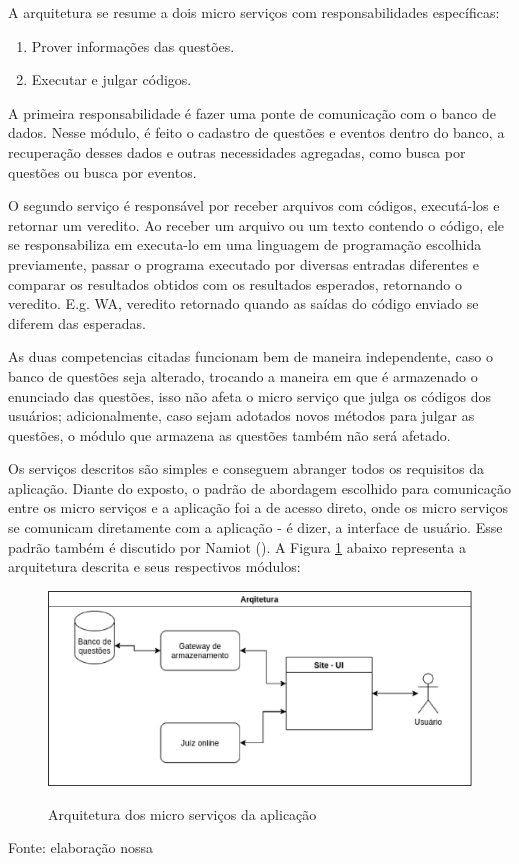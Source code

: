 A arquitetura se resume a dois micro serviços com responsabilidades específicas:
\begin{enumerate}
    \item Prover informações das questões.
    \item Executar e julgar códigos.
\end{enumerate}

A primeira responsabilidade é fazer uma ponte de comunicação com o banco de dados. Nesse módulo, é feito o cadastro de questões e eventos dentro do banco, a recuperação desses dados e outras necessidades agregadas, como busca por questões ou busca por eventos.

O segundo serviço é responsável por receber arquivos com códigos, executá-los e retornar um veredito. Ao receber um arquivo ou um texto contendo o código, ele se responsabiliza em executa-lo em uma linguagem de programação escolhida previamente, passar o programa executado por diversas entradas diferentes e comparar os resultados obtidos com os resultados esperados, retornando o veredito. E.g. WA, veredito retornado quando as saídas do código enviado se diferem das esperadas.

As duas competencias citadas funcionam bem de maneira independente, caso o banco de questões seja alterado, trocando a maneira em que é armazenado o enunciado das questões, isso não afeta o micro serviço que julga os códigos dos usuários; adicionalmente, caso sejam adotados novos métodos para julgar as questões, o módulo que armazena as questões também não será afetado.

Os serviços descritos são simples e conseguem abranger todos os requisitos da aplicação. Diante do exposto, o padrão de abordagem escolhido para comunicação entre os micro serviços e a aplicação foi a de acesso direto, onde os micro serviços se comunicam diretamente com a aplicação - é dizer, a interface de usuário. Esse padrão também é discutido por Namiot (\citeyear{namiot_d:OMSA}). A Figura \ref{fig:architecture} abaixo representa a arquitetura descrita e seus respectivos módulos:

\begin{figure}[h]
    \centering
    \caption{Arquitetura dos micro serviços da aplicação}
    \includegraphics[keepaspectratio=true,scale=0.6]{figuras/arquiteture.eps}
    \label{fig:architecture}
\end{figure}
\begin{center}
    Fonte: elaboração nossa
\end{center}


